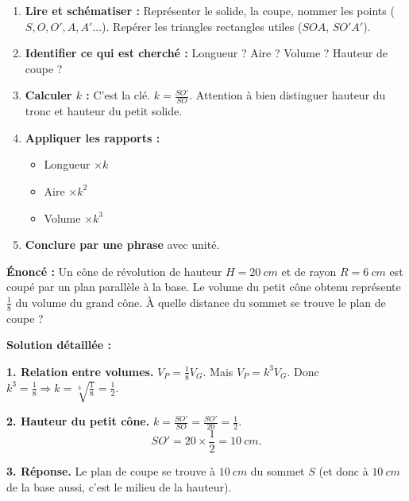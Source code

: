 \documentclass[11pt]{article}
\begin{document}
\begin{methode}
\begin{enumerate}
    \item \textbf{Lire et schématiser :} Représenter le solide, la coupe, nommer les points ($S, O, O', A, A'$...). Repérer les triangles rectangles utiles ($SOA$, $SO'A'$).
    \item \textbf{Identifier ce qui est cherché :} Longueur ? Aire ? Volume ? Hauteur de coupe ?
    \item \textbf{Calculer $k$ :} C'est la clé. $k = \frac{SO'}{SO}$. Attention à bien distinguer hauteur du tronc et hauteur du petit solide.
    \item \textbf{Appliquer les rapports :}
    \begin{itemize}
        \item Longueur $\times k$
        \item Aire $\times k^2$
        \item Volume $\times k^3$
    \end{itemize}
    \item \textbf{Conclure par une phrase} avec unité.
\end{enumerate}
\end{methode}

\begin{exoresolu}
\textbf{Énoncé :} Un cône de révolution de hauteur $H = \SI{20}{cm}$ et de rayon $R = \SI{6}{cm}$ est coupé par un plan parallèle à la base. Le volume du petit cône obtenu représente $\frac{1}{8}$ du volume du grand cône.
À quelle distance du sommet se trouve le plan de coupe ?

\textbf{Solution détaillée :}

\noindent \textbf{1. Relation entre volumes.}
$V_P = \frac{1}{8} V_G$.
Mais $V_P = k^3 V_G$.
Donc $k^3 = \frac{1}{8} \Rightarrow k = \sqrt[3]{\frac{1}{8}} = \frac{1}{2}$.

\noindent \textbf{2. Hauteur du petit cône.}
$k = \frac{SO'}{SO} = \frac{SO'}{20} = \frac{1}{2}$.
\[
SO' = 20 \times \frac{1}{2} = \SI{10}{cm}.
\]

\noindent \textbf{3. Réponse.}
Le plan de coupe se trouve à $\SI{10}{cm}$ du sommet $S$ (et donc à $\SI{10}{cm}$ de la base aussi, c'est le milieu de la hauteur).
\end{exoresolu}
\end{document}
